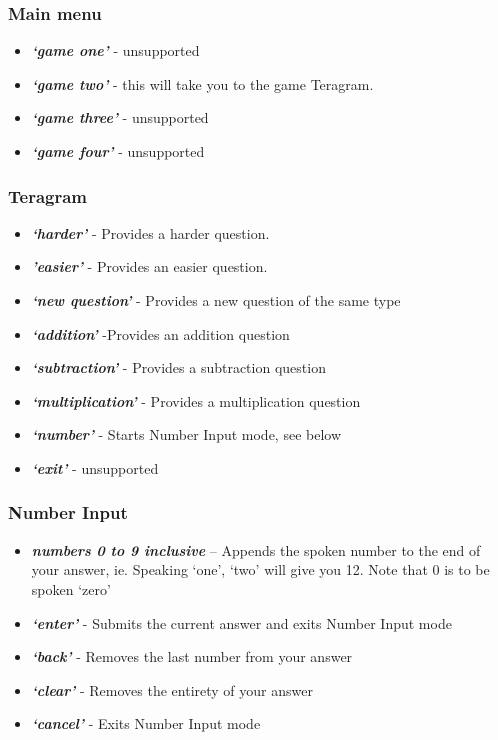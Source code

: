 \documentclass[11pt, oneside]{article}
\begin{document}
\subsubsection*{Main menu}

\begin{itemize}
  \item {\em\bf`game one'} - unsupported
  \item {\em\bf`game two'}  - this will take you to the game Teragram.
  \item {\em\bf`game three'} - unsupported
  \item {\em\bf`game four'} - unsupported
\end{itemize}

\subsubsection*{Teragram}

\begin{itemize}
  \item {\em\bf`harder'} - Provides a harder question. 
  \item {\em\bf'easier'} - Provides an easier question.
  \item {\em\bf`new question'} - Provides a new question of the same type
  \item {\em\bf`addition'} -Provides an addition question
  \item {\em\bf`subtraction'} - Provides a subtraction question
  \item {\em\bf`multiplication'} - Provides a multiplication question 
  \item {\em\bf`number'} - Starts Number Input mode, see below
  \item {\em\bf`exit'} - unsupported
\end{itemize}

\pagebreak

\subsubsection*{Number Input}
\begin{itemize}
  \item {\em\bf numbers 0 to 9 inclusive} – Appends the spoken number
    to the end of your answer, ie. Speaking `one', `two' will give you
    12. Note that 0 is to be spoken `zero'
  \item {\em\bf `enter'} - Submits the current answer and exits Number
    Input mode
  \item {\em\bf `back'} - Removes the last number from your answer
  \item {\em\bf `clear'} - Removes the entirety of your answer
  \item {\em\bf `cancel'} - Exits Number Input mode
\end{itemize}
\end{document}
